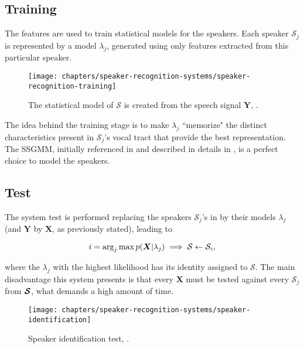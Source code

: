\subsection{Training}

The features are used to train statistical models for the speakers. Each speaker $\mathcal{S}_j$ is represented by a model $\lambda_j$, generated using only features extracted from this particular speaker.

\begin{figure}[ht]
    \centering
    \texttt{[image: chapters/speaker-recognition-systems/speaker-recognition-training]}
    \caption{The statistical model of $\mathcal{S}$ is created from the speech signal $\boldsymbol{Y}$, .}
    \label{fig:speaker-recognition-training}
\end{figure}

The idea behind the training stage is to make $\lambda_j$ ``memorize" the distinct characteristics present in $\mathcal{S}_j$'s vocal tract that provide the best representation. The SSGMM, initially referenced in  and described in details in , is a perfect choice to model the speakers.

\subsection{Test}

The system test is performed replacing the speakers $\mathcal{S}_j$'s in  by their models $\lambda_j$ (and $\boldsymbol{Y}$ by $\boldsymbol{X}$, as previously stated), leading to

\begin{equation}
    i = \arg_j\max\postpdf{\boldsymbol{X}}{\lambda_j} \implies \mathcal{S} \gets \mathcal{S}_i,
    \label{eq:speaker_identification}
\end{equation}

\noindent where the $\lambda_j$ with the highest likelihood has its identity assigned to $\mathcal{S}$. The main disadvantage this system presents is that every $\boldsymbol{X}$ must be tested against every $\mathcal{S}_j$ from $\boldsymbol{\mathcal{S}}$, what demands a high amount of time.

\begin{figure}[ht]
    \centering
    \texttt{[image: chapters/speaker-recognition-systems/speaker-identification]}
    \caption{Speaker identification test, .}
    \label{fig:speaker_identification}
\end{figure}

